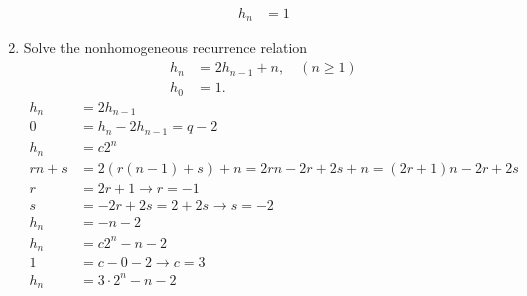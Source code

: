 \documentclass{article}
\begin{document}
\begin{enumerate}
\begin{align*}
    h_n&=1
  \end{align*}
  \item
  Solve the nonhomogeneous recurrence relation
  \begin{align*}
    h_n&=2h_{n-1}+n,\quad(n\ge1)\\
    h_0&=1.
  \end{align*}
  \begin{align*}
    h_n&=2h_{n-1}\\
    0&=h_n-2h_{n-1}=q-2\\
    h_n&=c2^n\\
    rn+s&=2(r(n-1)+s)+n=2rn-2r+2s+n=(2r+1)n-2r+2s\\
    r&=2r+1\to r=-1\\
    s&=-2r+2s=2+2s\to s=-2\\
    h_n&=-n-2\\
    h_n&=c2^n-n-2\\
    1&=c-0-2\to c=3\\
    h_n&=3\cdot2^n-n-2
  \end{align*}
\end{enumerate}
\end{document}
